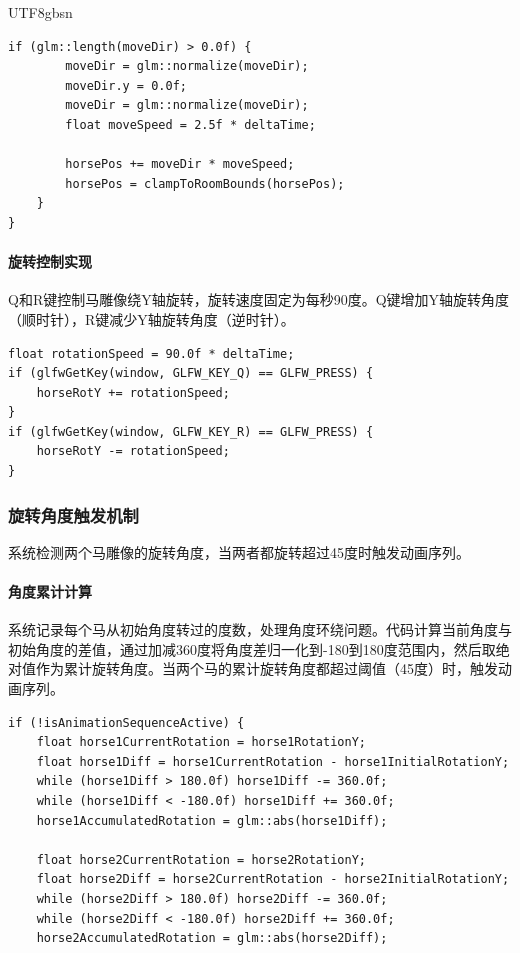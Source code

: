 \documentclass{article}
\begin{document}
\begin{CJK}{UTF8}{gbsn}
\begin{lstlisting}[caption=马的移动控制代码]
    if (glm::length(moveDir) > 0.0f) {
        moveDir = glm::normalize(moveDir);
        moveDir.y = 0.0f;
        moveDir = glm::normalize(moveDir);
        float moveSpeed = 2.5f * deltaTime;
        
        horsePos += moveDir * moveSpeed;
        horsePos = clampToRoomBounds(horsePos);
    }
}
\end{lstlisting}

\paragraph{旋转控制实现}
Q和R键控制马雕像绕Y轴旋转，旋转速度固定为每秒90度。Q键增加Y轴旋转角度（顺时针），R键减少Y轴旋转角度（逆时针）。

\begin{lstlisting}[caption=马的旋转控制代码]
float rotationSpeed = 90.0f * deltaTime;
if (glfwGetKey(window, GLFW_KEY_Q) == GLFW_PRESS) {
    horseRotY += rotationSpeed;
}
if (glfwGetKey(window, GLFW_KEY_R) == GLFW_PRESS) {
    horseRotY -= rotationSpeed;
}
\end{lstlisting}

\subsubsection{旋转角度触发机制}
系统检测两个马雕像的旋转角度，当两者都旋转超过45度时触发动画序列。

\paragraph{角度累计计算}
系统记录每个马从初始角度转过的度数，处理角度环绕问题。代码计算当前角度与初始角度的差值，通过加减360度将角度差归一化到-180到180度范围内，然后取绝对值作为累计旋转角度。当两个马的累计旋转角度都超过阈值（45度）时，触发动画序列。

\begin{lstlisting}[caption=旋转角度累计计算]
if (!isAnimationSequenceActive) {
    float horse1CurrentRotation = horse1RotationY;
    float horse1Diff = horse1CurrentRotation - horse1InitialRotationY;
    while (horse1Diff > 180.0f) horse1Diff -= 360.0f;
    while (horse1Diff < -180.0f) horse1Diff += 360.0f;
    horse1AccumulatedRotation = glm::abs(horse1Diff);
    
    float horse2CurrentRotation = horse2RotationY;
    float horse2Diff = horse2CurrentRotation - horse2InitialRotationY;
    while (horse2Diff > 180.0f) horse2Diff -= 360.0f;
    while (horse2Diff < -180.0f) horse2Diff += 360.0f;
    horse2AccumulatedRotation = glm::abs(horse2Diff);
    

\end{lstlisting}
\end{CJK}
\end{document}
